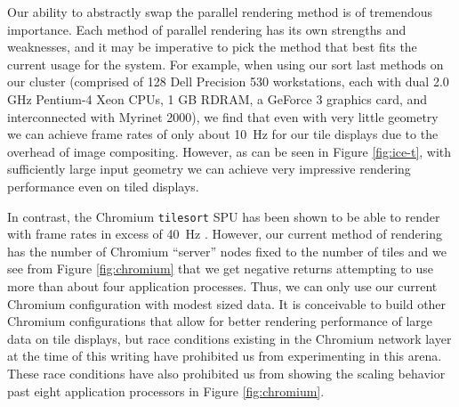 \documentclass{acmsiggraph}
\newcommand{\sticky}[1]{}
\newcommand{\cidentifier}[1]{\texttt{#1}}
\begin{document}

  Our ability to abstractly swap the parallel rendering method is of
  tremendous importance.  Each method of parallel rendering has its own
  strengths and weaknesses, and it may be imperative to pick the method
  that best fits the current usage for the system.  For example, when using
  our sort last methods on our cluster (comprised of 128 Dell Precision 530
  workstations, each with dual 2.0 GHz Pentium-4 Xeon CPUs, 1 GB RDRAM, a
  GeForce 3 graphics card, and interconnected with Myrinet 2000), we find
  that even with very little geometry we can achieve frame rates of only
  about 10~Hz for our tile displays due to the overhead of image
  compositing.  However, as can be seen in Figure \ref{fig:ice-t}, with
  sufficiently large input geometry we can achieve very impressive
  rendering performance even on tiled displays.

  In contrast, the Chromium \cidentifier{tile\-sort} SPU has been shown to
  be able to render with frame rates in excess of 40~Hz \cite{Humphreys02}.
  However, our current method of rendering has the number of Chromium
  ``server'' nodes fixed to the number of tiles and we see from Figure
  \ref{fig:chromium} that we get negative returns attempting to use more
  than about four application processes.  Thus, we can only use our current
  Chromium configuration with modest sized data.  It is conceivable to
  build other Chromium configurations that allow for better rendering
  performance of large data on tile displays, but race conditions existing
  in the Chromium network layer at the time of this writing have prohibited
  us from experimenting in this arena.  These race conditions have also
  prohibited us from showing the scaling behavior past eight application
  processors in Figure \ref{fig:chromium}.

\end{document}
